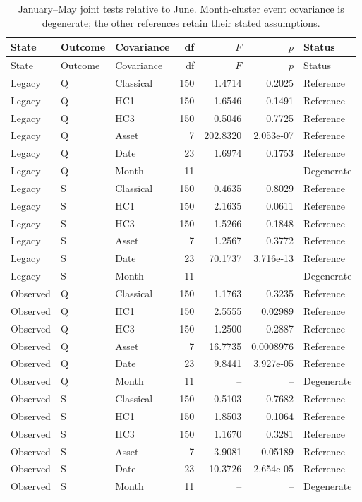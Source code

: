 {\small
\begin{longtable}{lllrrrl}
\caption{January--May joint tests relative to June. Month-cluster event covariance is degenerate; the other references retain their stated assumptions.}\label{tab:event_pretrend_rebuilt}\\
\toprule State & Outcome & Covariance & df & $F$ & $p$ & Status\\\midrule\endfirsthead
\toprule State & Outcome & Covariance & df & $F$ & $p$ & Status\\\midrule\endhead
\bottomrule\endfoot
Legacy & Q & Classical & 150 & 1.4714 & 0.2025 & Reference\\
Legacy & Q & HC1 & 150 & 1.6546 & 0.1491 & Reference\\
Legacy & Q & HC3 & 150 & 0.5046 & 0.7725 & Reference\\
Legacy & Q & Asset & 7 & 202.8320 & 2.053e-07 & Reference\\
Legacy & Q & Date & 23 & 1.6974 & 0.1753 & Reference\\
Legacy & Q & Month & 11 & -- & -- & Degenerate\\
Legacy & S & Classical & 150 & 0.4635 & 0.8029 & Reference\\
Legacy & S & HC1 & 150 & 2.1635 & 0.0611 & Reference\\
Legacy & S & HC3 & 150 & 1.5266 & 0.1848 & Reference\\
Legacy & S & Asset & 7 & 1.2567 & 0.3772 & Reference\\
Legacy & S & Date & 23 & 70.1737 & 3.716e-13 & Reference\\
Legacy & S & Month & 11 & -- & -- & Degenerate\\
Observed & Q & Classical & 150 & 1.1763 & 0.3235 & Reference\\
Observed & Q & HC1 & 150 & 2.5555 & 0.02989 & Reference\\
Observed & Q & HC3 & 150 & 1.2500 & 0.2887 & Reference\\
Observed & Q & Asset & 7 & 16.7735 & 0.0008976 & Reference\\
Observed & Q & Date & 23 & 9.8441 & 3.927e-05 & Reference\\
Observed & Q & Month & 11 & -- & -- & Degenerate\\
Observed & S & Classical & 150 & 0.5103 & 0.7682 & Reference\\
Observed & S & HC1 & 150 & 1.8503 & 0.1064 & Reference\\
Observed & S & HC3 & 150 & 1.1670 & 0.3281 & Reference\\
Observed & S & Asset & 7 & 3.9081 & 0.05189 & Reference\\
Observed & S & Date & 23 & 10.3726 & 2.654e-05 & Reference\\
Observed & S & Month & 11 & -- & -- & Degenerate\\
\end{longtable}
}

